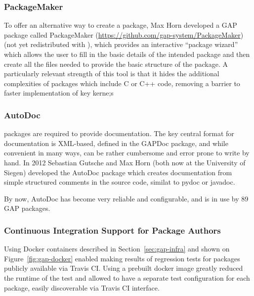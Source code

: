 \subsubsection{PackageMaker}
To offer an alternative way to create a package,
Max Horn developed a GAP package called {\sf PackageMaker}
(\url{https://github.com/gap-system/PackageMaker}) (not yet redistributed with \GAP),
which provides an interactive  ``package wizard'' which allows the
user to fill in the basic details 
of the intended package and then create all the files needed to
provide the basic structure of the package. A particularly relevant
strength of this tool is that it hides the additional complexities of
packages which include C or C++ code, removing a barrier to faster implementation
of key kerne;s

\subsubsection{AutoDoc}
\GAP packages are required to provide documentation.  The key central
format for \GAP documentation is XML-based, defined in the {\sf
  GAPDoc} package, and while convenient in many ways, can be rather
cumbersome and error prone to write by hand.
In 2012 Sebastian Gutsche 
and Max Horn (both now at the University of Siegen) developed the 
{\sf AutoDoc} package \cite{autodoc} which creates
documentation from simple structured comments in the source code,
similat to pydoc or javadoc.

By now, {\sf AutoDoc} has become very reliable and configurable, and
is in use by 89 GAP packages.
%
%

\subsubsection{Continuous Integration Support for Package Authors}
Using Docker containers described in Section~\ref{sec:gap-infra}
and shown on Figure~\ref{fig:gap-docker} enabled making 
results of regression tests for \GAP packages publicly
available via Travis CI. Using a prebuilt docker image 
greatly reduced the runtime of the test and allowed to
have a separate test configuration for each package,
easily discoverable via Travis CI interface.

